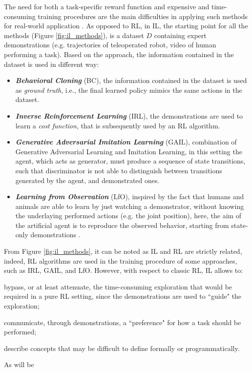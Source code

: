 
\noindent The need for both a task-specific reward function and expensive and time-consuming training procedures are the main difficulties in applying such methods for real-world application
\cite{hussein2017imitation_learning_survey}. \newline As opposed to RL, in IL, the starting point for all the methods
(Figure \ref{fig:il_methods}), is a dataset $D$ containing expert demonstrations (e.g. trajectories of teleoperated
robot, video of human performing a task). Based on the approach, the information contained in the dataset
is used in different way:
\begin{itemize}
    \item \textbf{\textit{Behavioral Cloning}} (BC), the information contained in the dataset is used as \textit{ground
    truth}, i.e., the final learned policy mimics the same actions in the dataset.
    \item \textbf{\textit{Inverse Reinforcement Learning}} (IRL), the demonstrations are used to learn a \textit{cost
    function}, that is subsequently used by an RL algorithm.
    \item \textbf{\textit{Generative Adversarial Imitation Learning}} (GAIL), combination of Generative Adversarial Learning and Imitation Learning, in this
    setting the agent, which acts as generator, must produce a sequence of state transitions, such that
    discriminator is not able to distinguish between transitions generated by the agent, and demonstrated ones.
    \item \textbf{\textit{Learning from Observation}} (LfO), inspired by the fact that humans and animals are able to
    learn by just watching a demonstrator, without knowing the underlaying performed actions (e.g. the joint position),
    here, the aim of the artificial agent is to reproduce the observed behavior, starting from state-only demonstrations
    \cite{torabi2019recent_advances_lfo}.  
\end{itemize}

\noindent From Figure \ref{fig:il_methods}, it can be noted as IL and RL are strictly related, indeed, RL algorithms are used in
the training procedure of some approaches, such as IRL, GAIL, and LfO. However, with respect to classic RL, IL allows to:
\begin{enumerate*}[label=\textbf{(\arabic*)}]
    \item bypass, or at least attenuate, the time-consuming exploration that would be required in a pure RL setting, since the demonstrations are used to ``guide" the exploration;
    \item communicate, through demonstrations, a ``preference" for how a task should be performed;
    \item describe concepts that may be difficult to define formally or programmatically. \end{enumerate*} As will be
